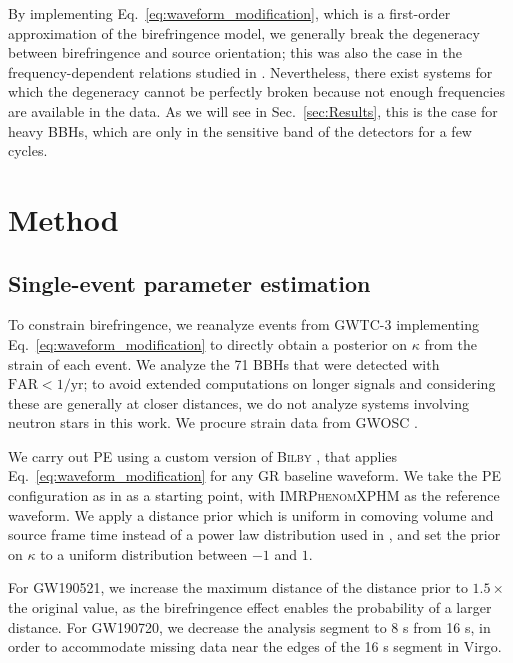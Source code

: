 \documentclass[aps,prd,twocolumn,superscriptaddress,preprintnumbers,floatfix,nofootinbib]{revtex4-2}
\begin{document}
By implementing Eq.~\eqref{eq:waveform_modification}, which is a first-order approximation of the birefringence model, we generally break the degeneracy between birefringence and source orientation; this was also the case in the frequency-dependent relations studied in \cite{Yamada_2020,Wang_2021}.
Nevertheless, there exist systems for which the degeneracy cannot be perfectly broken because not enough frequencies are available in the data.
As we will see in Sec.~\ref{sec:Results}, this is the case for heavy \acp{BBH}, which are only in the sensitive band of the detectors for a few cycles.

\section{Method}
\label{sec:Method}

\subsection{Single-event parameter estimation}

To constrain birefringence, we reanalyze events from GWTC-3 \citep{GWTC-2.1, GWTC-3} implementing Eq.~\eqref{eq:waveform_modification} to directly obtain a posterior on $\kappa$ from the strain of each event.
We analyze the 71 \acp{BBH} that were detected with $\mathrm{FAR} < 1/\mathrm{yr}$; to avoid extended computations on longer signals and considering these are generally at closer distances, we do not analyze systems involving neutron stars in this work.
We procure strain data from \ac{GWOSC} \citep{GWOSC}.

We carry out \ac{PE} using a custom version of \textsc{Bilby} \citep{Bilby}, that applies Eq.~\eqref{eq:waveform_modification} for any \ac{GR} baseline waveform.
We take the \ac{PE} configuration as in \citet{GWTC-2.1, GWTC-3, GWTC-2.1_dataset, GWTC-3_dataset} as a starting point, with \textsc{IMRPhenomXPHM} \citep{Pratten:2020ceb} as the reference waveform.
We apply a distance prior which is uniform in comoving volume and source frame time instead of a power law distribution used in \citet{GWTC-2.1, GWTC-3, GWTC-2.1_dataset, GWTC-3_dataset}, and set the prior on $\kappa$ to a uniform distribution between $-1$ and $1$.

For GW190521, we increase the maximum distance of the distance prior to $1.5\times$ the original value, as the birefringence effect enables the probability of a larger distance.
For GW190720, we decrease the analysis segment to 8 s from 16 s, in order to accommodate missing data near the edges of the 16 s segment in Virgo.
\end{document}
